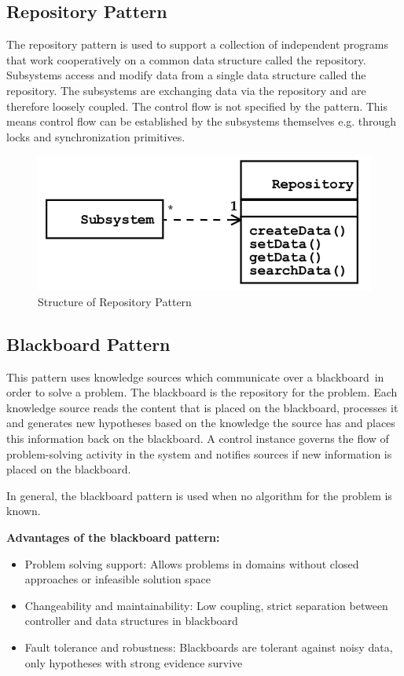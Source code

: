 \subsection{Repository Pattern}
The repository pattern is used to support a collection of independent programs that work cooperatively on a common data structure called the repository.
Subsystems access and modify data from a single data structure called the repository.
The subsystems are exchanging data via the repository and are therefore loosely coupled.
The control flow is not specified by the pattern.
This means control flow can be established by the subsystems themselves e.g. through
locks and synchronization primitives.\newline
\begin{figure}[h]
	\centering
	\includegraphics[width=0.7\linewidth]{images/pattern_repository.png}
	\caption{Structure of Repository Pattern}
\end{figure}
\newpage


\subsection{Blackboard Pattern}
This pattern uses knowledge sources which communicate over a \glqq blackboard\grqq \ in order to solve a problem.
The blackboard is the repository for the problem.
Each knowledge source reads the content that is placed on the blackboard, processes it and generates new hypotheses based on the knowledge the source has and places this information back on the blackboard.
A control instance governs the flow of problem-solving activity in the system and notifies sources if new information is placed on the blackboard.

In general, the blackboard pattern is used when no algorithm for the problem is known.
\newline

\textbf{Advantages of the blackboard pattern:}
\begin{itemize}[topsep=5pt, itemsep=0pt]
	\item Problem solving support:
		\subitem Allows problems in domains without closed approaches or infeasible solution space
	\item Changeability and maintainability:
		\subitem Low coupling, strict separation between controller	and data structures in blackboard
	\item Fault tolerance and robustness:
		\subitem Blackboards  are tolerant against noisy data, only hypotheses with strong evidence survive
\end{itemize}

